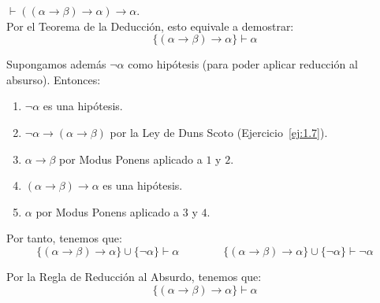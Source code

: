 \begin{ejercicio}\label{ej:1.26}
    $\vdash ((\alpha \rightarrow \beta) \rightarrow \alpha) \rightarrow \alpha$.\\

    Por el Teorema de la Deducción, esto equivale a demostrar:
    \begin{equation*}
        \{(\alpha\rightarrow\beta)\rightarrow\alpha\} \vdash \alpha
    \end{equation*}

    Supongamos además $\neg \alpha$ como hipótesis (para poder aplicar reducción al absurso). Entonces:
    \begin{enumerate}
        \item $\neg\alpha$ es una hipótesis.
        \item $\neg\alpha\rightarrow(\alpha\rightarrow\beta)$ por la Ley de Duns Scoto (Ejercicio~\ref{ej:1.7}).
        \item $\alpha\rightarrow\beta$ por Modus Ponens aplicado a $1$ y $2$.
        \item $(\alpha\rightarrow\beta)\rightarrow\alpha$ es una hipótesis.
        \item $\alpha$ por Modus Ponens aplicado a $3$ y $4$.
    \end{enumerate}

    Por tanto, tenemos que:
    \begin{equation*}
        \{(\alpha\rightarrow\beta)\rightarrow\alpha\} \cup \{\neg\alpha\} \vdash \alpha\qquad\qquad \{(\alpha\rightarrow\beta)\rightarrow\alpha\} \cup \{\neg\alpha\} \vdash \neg\alpha
    \end{equation*}

    Por la Regla de Reducción al Absurdo, tenemos que:
    \begin{equation*}
        \{(\alpha\rightarrow\beta)\rightarrow\alpha\} \vdash \alpha
    \end{equation*}
\end{ejercicio}

